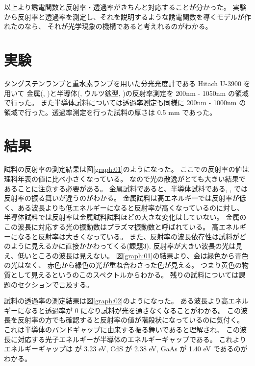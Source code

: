 \documentclass[11pt,dvipdfmx,a4paper]{jsarticle}
\begin{document}
以上より誘電関数と反射率・透過率がきちんと対応することが分かった。
実験から反射率と透過率を測定し、それを説明するような誘電関数を導くモデルが作れたのなら、
それが光学現象の機構であると考えれるのがわかる。

\section{実験}
タングステンランプと重水素ランプを用いた分光光度計である Hitach U-3900 を用いて
金属(, )と半導体(, ウルツ鉱型, )の反射率測定を 200nm - 1050nm の領域で行った。
また半導体試料については透過率測定も同様に 200nm - 1000nm の領域で行った。透過率測定を行った試料の厚さは 0.5 mm であった。

\section{結果}
試料の反射率の測定結果は図\ref{graph:01}のようになった。
ここでの反射率の値は理科年表\cite{rikanenpyo}の値に比べ小さくなっている。
なので光の散逸がとても大きい結果であることに注意する必要がある。
金属試料であると、半導体試料である, ,  では反射率の振る舞いが違うのがわかる。
金属試料は高エネルギーでは反射率が低く、ある波長よりも低エネルギーになると反射率が高くなっているのに対し、
半導体試料では反射率は金属試料試料ほどの大きな変化はしていない。
金属のこの波長に対応する光の振動数はプラズマ振動数と呼ばれている。
高エネルギーになると反射率は大きくなっている。
また、反射率の波長依存性は試料がどのように見えるかに直接かかわってくる(課題3).
反射率が大きい波長の光は見え、低いところの波長は見えない。
図\ref{graph:01}の結果より、金は緑色から青色の光はなく、
赤色から緑色の光が重ね合わさった色が見える。
つまり黄色の物質として見えるというのこのスペクトルからわかる。
残りの試料については課題のセクションで言及する。

試料の透過率の測定結果は図\ref{graph:02}のようになった。
ある波長より高エネルギーになると透過率が 0 になり試料が光を通さなくなることがわかる。
この波長を反射率の方でも確認すると反射率の値が階段状になっているのに気付く。
これは半導体のバンドギャップに由来する振る舞いであると理解され、
この波長に対応する光子エネルギーが半導体のエネルギーギャップである。
これよりエネルギーギャップは  が 3.23 eV, CdS が 2.38 eV, GaAs が 1.40 eV であるのがわかる。
\end{document}
